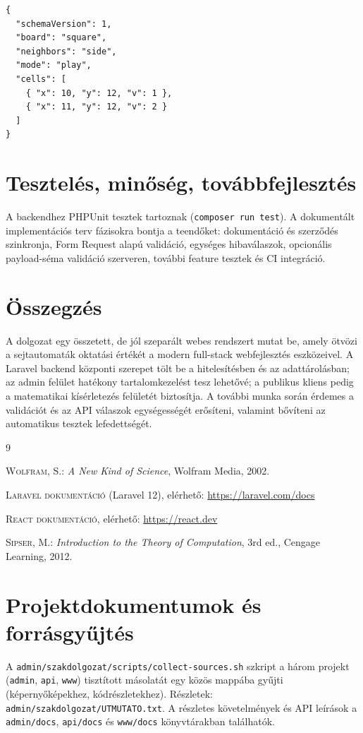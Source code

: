 \documentclass[12pt,a4paper,openany]{book}
\begin{document}
\begin{lstlisting}[firstnumber=1]
{
  "schemaVersion": 1,
  "board": "square",
  "neighbors": "side",
  "mode": "play",
  "cells": [
    { "x": 10, "y": 12, "v": 1 },
    { "x": 11, "y": 12, "v": 2 }
  ]
}
\end{lstlisting}

\chapter{Tesztelés, minőség, továbbfejlesztés}
\label{ch:minoseg}

A backendhez PHPUnit tesztek tartoznak (\texttt{composer run test}). A dokumentált implementációs terv fázisokra bontja a teendőket: dokumentáció és szerződés szinkronja, Form Request alapú validáció, egységes hibaválaszok, opcionális payload-séma validáció szerveren, további feature tesztek és CI integráció.

\chapter{Összegzés}
\label{ch:ossz}

A dolgozat egy összetett, de jól szeparált webes rendszert mutat be, amely ötvözi a sejtautomaták oktatási értékét a modern full-stack webfejlesztés eszközeivel. A Laravel backend központi szerepet tölt be a hitelesítésben és az adattárolásban; az admin felület hatékony tartalomkezelést tesz lehetővé; a publikus kliens pedig a matematikai kísérletezés felületét biztosítja. A további munka során érdemes a validációt és az API válaszok egységességét erősíteni, valamint bővíteni az automatikus tesztek lefedettségét.

\backmatter

\begin{thebibliography}{9}

\textsc{Wolfram, S.}: \emph{A New Kind of Science}, Wolfram Media, 2002.

\textsc{Laravel dokumentáció} (Laravel 12), elérhető: \url{https://laravel.com/docs}

\textsc{React dokumentáció}, elérhető: \url{https://react.dev}

\textsc{Sipser, M.}: \emph{Introduction to the Theory of Computation}, 3rd ed., Cengage Learning, 2012.

\end{thebibliography}

\appendix
\chapter{Projektdokumentumok és forrásgyűjtés}
A \texttt{admin/szakdolgozat/scripts/collect-sources.sh} szkript a három projekt (\texttt{admin}, \texttt{api}, \texttt{www}) tisztított másolatát egy közös mappába gyűjti (képernyőképekhez, kódrészletekhez). Részletek: \texttt{admin/szakdolgozat/UTMUTATO.txt}. A részletes követelmények és API leírások a \texttt{admin/docs}, \texttt{api/docs} és \texttt{www/docs} könyvtárakban találhatók.
\end{document}
